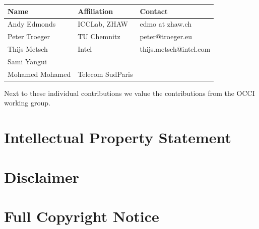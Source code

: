 \documentclass[10pt,a4paper]{article}
\begin{document}
\begin{tabular}{l|p{2in}|p{2in}}
Name & Affiliation & Contact \\
\hline
Andy Edmonds & ICCLab, ZHAW & edmo at zhaw.ch \\
Peter Troeger & TU Chemnitz & peter@troeger.eu \\
Thijs Metsch & Intel & thijs.metsch@intel.com\\
Sami Yangui & & \\
Mohamed Mohamed & Telecom SudParis & \\
\end{tabular}

Next to these individual contributions we value the contributions from
the OCCI working group.

\section{Intellectual Property Statement}


\section{Disclaimer}


\section{Full Copyright Notice}




\end{document}
